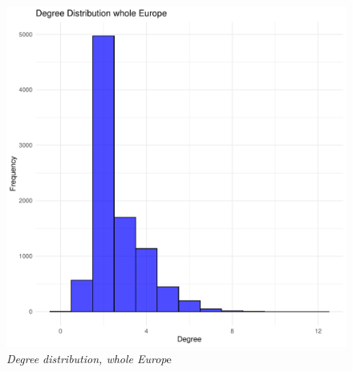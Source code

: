 \begin{figure}
	\centering
	\includegraphics[scale = 0.5]{images/DDEU.pdf}
	\caption{\textit{Degree distribution, whole Europ}e}
	\label{fig::ddeu}
\end{figure}

